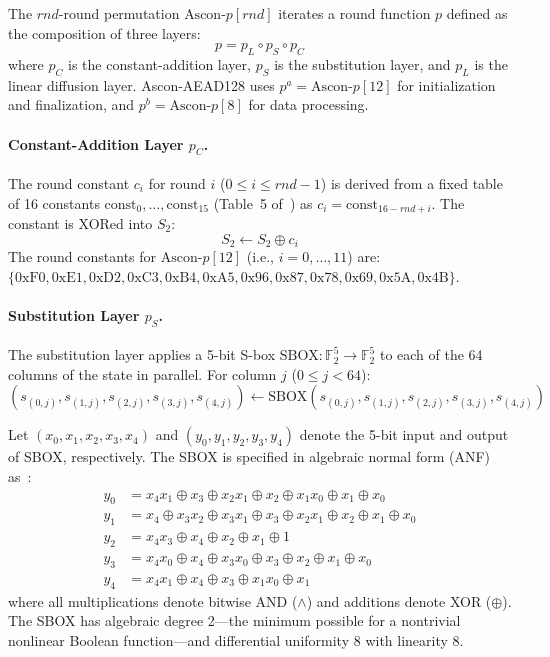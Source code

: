 \documentclass[11pt,a4paper]{article}
\newcommand{\F}{\mathbb{F}}
\newcommand{\xor}{\oplus}
\begin{document}
The $rnd$-round permutation $\text{Ascon-}p[rnd]$ iterates a round function $p$ defined as the composition of three layers:
\begin{equation}
p = p_L \circ p_S \circ p_C
\label{eq:ascon_round}
\end{equation}
where $p_C$ is the constant-addition layer, $p_S$ is the substitution layer, and $p_L$ is the linear diffusion layer. Ascon-AEAD128 uses $p^a = \text{Ascon-}p[12]$ for initialization and finalization, and $p^b = \text{Ascon-}p[8]$ for data processing.

\paragraph{Constant-Addition Layer $p_C$.}
The round constant $c_i$ for round $i$ ($0 \leq i \leq rnd-1$) is derived from a fixed table of 16 constants $\text{const}_0,\ldots,\text{const}_{15}$ (Table~5 of~\cite{nist_sp800_232}) as $c_i = \text{const}_{16-rnd+i}$. The constant is XORed into $S_2$:
\begin{equation}
S_2 \leftarrow S_2 \xor c_i
\label{eq:ascon_pc}
\end{equation}
The round constants for $\text{Ascon-}p[12]$ (i.e., $i = 0,\ldots,11$) are: \\
$\{0\text{xF0}, 0\text{xE1}, 0\text{xD2}, 0\text{xC3}, 0\text{xB4}, 0\text{xA5}, 0\text{x96}, 0\text{x87}, 0\text{x78}, 0\text{x69}, 0\text{x5A}, 0\text{x4B}\}$.

\paragraph{Substitution Layer $p_S$.}
The substitution layer applies a 5-bit S-box $\text{SBOX}: \F_2^5 \to \F_2^5$ to each of the 64 columns of the state in parallel. For column $j$ ($0 \leq j < 64$):
\begin{equation}
(s_{(0,j)}, s_{(1,j)}, s_{(2,j)}, s_{(3,j)}, s_{(4,j)}) \leftarrow \text{SBOX}(s_{(0,j)}, s_{(1,j)}, s_{(2,j)}, s_{(3,j)}, s_{(4,j)})
\label{eq:ascon_ps_apply}
\end{equation}

Let $(x_0, x_1, x_2, x_3, x_4)$ and $(y_0, y_1, y_2, y_3, y_4)$ denote the 5-bit input and output of SBOX, respectively. The SBOX is specified in algebraic normal form (ANF) as~\cite{nist_sp800_232}:
\begin{align}
y_0 &= x_4 x_1 \xor x_3 \xor x_2 x_1 \xor x_2 \xor x_1 x_0 \xor x_1 \xor x_0 \nonumber\\
y_1 &= x_4 \xor x_3 x_2 \xor x_3 x_1 \xor x_3 \xor x_2 x_1 \xor x_2 \xor x_1 \xor x_0 \nonumber\\
y_2 &= x_4 x_3 \xor x_4 \xor x_2 \xor x_1 \xor 1 \nonumber\\
y_3 &= x_4 x_0 \xor x_4 \xor x_3 x_0 \xor x_3 \xor x_2 \xor x_1 \xor x_0 \nonumber\\
y_4 &= x_4 x_1 \xor x_4 \xor x_3 \xor x_1 x_0 \xor x_1
\label{eq:ascon_sbox_anf}
\end{align}
where all multiplications denote bitwise AND ($\land$) and additions denote XOR ($\xor$). The SBOX has algebraic degree 2---the minimum possible for a nontrivial nonlinear Boolean function---and differential uniformity 8 with linearity 8.
\end{document}

